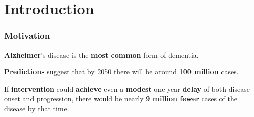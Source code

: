 \section{Introduction}

\begin{frame}
	\frametitle{Motivation}
	
	\Large
	
	\vspace{0.4cm}
	
	\textbf{Alzheimer}'s disease is the \textbf{most common} form of dementia.
	
	\vspace{0.4cm}
	
	\textbf{Predictions} suggest that by 2050 there will be around \textbf{100 million} cases. \\
	
	\vspace{0.4cm}
	
	If \textbf{intervention} could \textbf{achieve} even a \textbf{modest} one year \textbf{delay} of
	both disease onset and progression, there would be nearly \textbf{9 million fewer} cases of the
	disease by that time. \\
\end{frame}

